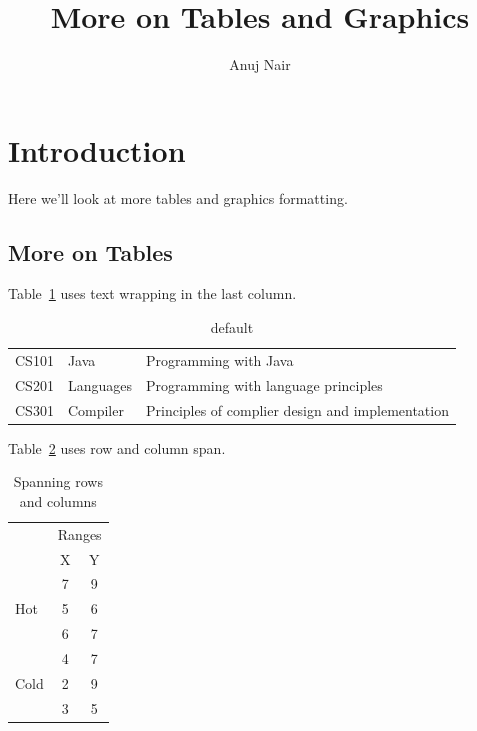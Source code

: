 \documentclass{proc}
\title{More on Tables and Graphics}
\author{Anuj Nair}
\date{}
\begin{document}
\maketitle

\section{Introduction}
 Here we'll look at more tables and graphics formatting.
	\subsection{More on Tables}

			Table~\ref{tab:wrapping} uses text wrapping in the last column.
			\begin{table}[htbp]
				\caption{default}
				\begin{center}
					\begin{tabular}{| l | l | p{3cm} |}		
						\hline
						CS101 & Java & Programming with Java \\
						CS201 & Languages & Programming with language principles \\
						CS301 & Compiler & Principles of complier design and implementation \\
						\hline
					\end{tabular}
				\end{center}
				\label{tab:wrapping}
			\end{table}
			

			Table~\ref{tab:multi} uses row and column span.
			\begin{table}[htbp]
				\caption{Spanning rows and columns}
				\begin{center}
					\begin{tabular}{| l | c | c |}		
						\hline
						& \multicolumn{2}{c|}{Ranges}\\
						\cline{2-3}
						& X & Y \\
						\hline
						\multirow{3}{*}{Hot}& 7 & 9\\
																& 5 & 6 \\
																& 6 & 7\\
																\hline
						\multirow{3}{*}{Cold}& 4 & 7\\
																& 2 & 9 \\
																& 3 & 5 \\
						\hline
					\end{tabular}
				\end{center}
				\label{tab:multi}
			\end{table}
   
\end{document}

